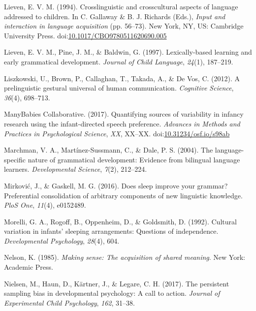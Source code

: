 \documentclass[floatsintext,man]{apa6}
\theoremstyle{definition}
\theoremstyle{definition}
\theoremstyle{definition}
\theoremstyle{remark}
\begin{document}
\hypertarget{ref-lieven1994crosslinguistic}{}
Lieven, E. V. M. (1994). Crosslinguistic and crosscultural aspects of
language addressed to children. In C. Gallaway \& B. J. Richards (Eds.),
\emph{Input and interaction in language acquisition} (pp. 56--73). New
York, NY, US: Cambridge University Press.
doi:\href{https://doi.org/10.1017/CBO9780511620690.005}{10.1017/CBO9780511620690.005}

\hypertarget{ref-lieven1997lexically}{}
Lieven, E. V. M., Pine, J. M., \& Baldwin, G. (1997). Lexically-based
learning and early grammatical development. \emph{Journal of Child
Language}, \emph{24}(1), 187--219.

\hypertarget{ref-liszkowski2012prelinguistic}{}
Liszkowski, U., Brown, P., Callaghan, T., Takada, A., \& De Vos, C.
(2012). A prelinguistic gestural universal of human communication.
\emph{Cognitive Science}, \emph{36}(4), 698--713.

\hypertarget{ref-manybabies2017}{}
ManyBabies Collaborative. (2017). Quantifying sources of variability in
infancy research using the infant-directed speech preference.
\emph{Advances in Methods and Practices in Psychological Science},
\emph{XX}, XX--XX.
doi:\href{https://doi.org/10.31234/osf.io/s98ab}{10.31234/osf.io/s98ab}

\hypertarget{ref-marchman2004language}{}
Marchman, V. A., Martínez-Sussmann, C., \& Dale, P. S. (2004). The
language-specific nature of grammatical development: Evidence from
bilingual language learners. \emph{Developmental Science}, \emph{7}(2),
212--224.

\hypertarget{ref-mirkovic2016does}{}
Mirković, J., \& Gaskell, M. G. (2016). Does sleep improve your grammar?
Preferential consolidation of arbitrary components of new linguistic
knowledge. \emph{PloS One}, \emph{11}(4), e0152489.

\hypertarget{ref-morelli1992cultural}{}
Morelli, G. A., Rogoff, B., Oppenheim, D., \& Goldsmith, D. (1992).
Cultural variation in infants' sleeping arrangements: Questions of
independence. \emph{Developmental Psychology}, \emph{28}(4), 604.

\hypertarget{ref-nelson1985making}{}
Nelson, K. (1985). \emph{Making sense: The acquisition of shared
meaning}. New York: Academic Press.

\hypertarget{ref-nielsen2017persistent}{}
Nielsen, M., Haun, D., Kärtner, J., \& Legare, C. H. (2017). The
persistent sampling bias in developmental psychology: A call to action.
\emph{Journal of Experimental Child Psychology}, \emph{162}, 31--38.
\end{document}
